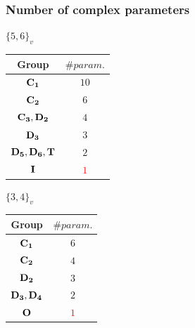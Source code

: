 \documentclass{beamer}
\begin{document}
\begin{frame}\frametitle{Number of complex parameters} 
\vspace{-4.5mm}

{\small
\begin{minipage}{4.5cm}
\centering   
$\{5,6\}_v$\par
\begin{tabular}{||c|c||}
\hline\hline
Group  & $\# param.$\\
\hline\hline
${\bf C_1}$  &$10$\\
${\bf C_2}$  &$6$\\ 
${\bf C_3, D_2}$  &$4$\\
${\bf D_3}$  &$3$\\  
${\bf D_5,D_6,T}$  &$2$\\
${\bf I}$    &\textcolor{red}{$1$}\\
\hline\hline
\end{tabular}
\end{minipage}
\begin{minipage}{4.5cm}
\centering
$\{3,4\}_v$\par
\begin{tabular}{||c|c||}
\hline\hline
Group  & $\# param.$\\
\hline\hline
${\bf C_1}$  & $6$\\
${\bf C_2}$  & $4$\\
${\bf D_2}$  & $3$\\
${\bf D_3, D_4}$  & $2$\\
${\bf O}$    & \textcolor{red}{$1$}\\
\hline\hline  
\end{tabular} 
\end{minipage}

}
\end{frame}
\end{document}
